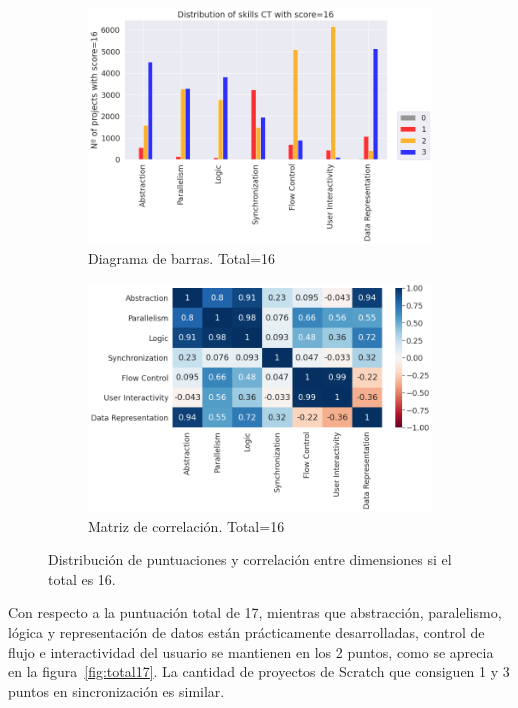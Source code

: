 \documentclass[a4paper, 12pt]{book}
\begin{document}
\begin{figure}[H]
    \centering
    \begin{subfigure}[h]{.49\textwidth} 
        \includegraphics[width=\textwidth]{img/distribucion_16_Scratch}
        \caption{Diagrama de barras. Total=16}
        \label{fig:total16}
    \end{subfigure}       
    \begin{subfigure}[h]{.49\textwidth} 
        \includegraphics[width=\textwidth]{img/corr_16_Scratch}
        \caption{Matriz de correlación. Total=16}
        \label{fig:corr16}
    \end{subfigure}
     \caption{Distribución de puntuaciones y correlación entre dimensiones si el total es 16.}
\end{figure}

Con respecto a la puntuación total de 17, mientras que abstracción, paralelismo, lógica y representación de datos están prácticamente desarrolladas, control de flujo e interactividad del usuario se mantienen en los 2 puntos, como se aprecia en la figura~\ref{fig:total17}. La cantidad de proyectos de Scratch que consiguen 1 y 3 puntos en sincronización es similar.
\end{document}
